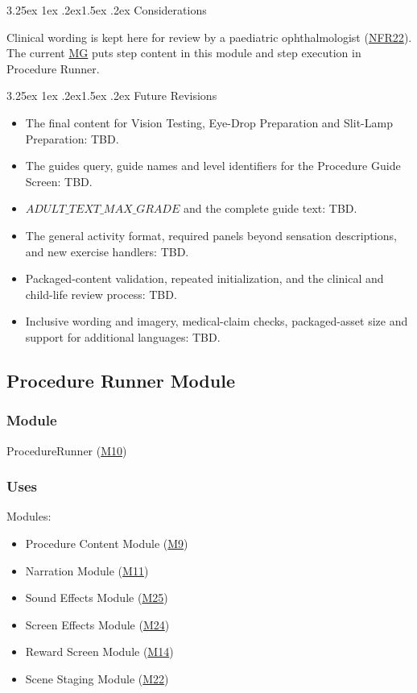 \documentclass[10pt, titlepage]{article}
\makeatletter
\newcommand{\srsurl}{https://team-hindsight.github.io/ophthamology-game/SRS/SRS.pdf}
\newcommand{\srsitemref}[2]{\href{\srsurl\#nameddest=#1}{#2}}
\newcommand{\mgurl}{https://github.com/team-hindsight/ophthamology-game/blob/main/pdfs/Design/SoftArchitecture/MG.pdf}
\newcommand{\mg}{\href{\mgurl}{MG}}
\newcommand{\misref}[2]{\hyperref[mis:#1]{M#2}}
\renewcommand\paragraph{\@startsection{paragraph}{4}{\z@}%
  {3.25ex \@plus 1ex \@minus .2ex}{1.5ex \@plus .2ex}%
  {\normalfont\normalsize\bfseries}}
\newcommand{\T}[1]{\mathit{#1}}          %
\makeatother
\begin{document}
\paragraph{Considerations}

Clinical wording is kept here for review by a paediatric ophthalmologist
(\srsitemref{NFR_ClinicalAccuracy}{NFR22}). The current \mg{} puts step
content in this module
and step execution in Procedure Runner.

\paragraph{Future Revisions}

\begin{itemize}
\item The final content for Vision Testing, Eye-Drop Preparation and
  Slit-Lamp Preparation: TBD.
\item The guides query, guide names and level identifiers for the
  Procedure Guide Screen: TBD.
\item $\T{ADULT\_TEXT\_MAX\_GRADE}$ and the complete guide text: TBD.
\item The general activity format, required panels beyond sensation
  descriptions, and new exercise handlers: TBD.
\item Packaged-content validation, repeated initialization, and the
  clinical and child-life review process: TBD.
\item Inclusive wording and imagery, medical-claim checks, packaged-asset
  size and support for additional languages: TBD.
\end{itemize}

\newpage
\subsection{Procedure Runner Module} \label{mis:Runner}

\subsubsection{Module}

ProcedureRunner (\misref{Runner}{10})

\subsubsection{Uses}

Modules:
\begin{itemize}
\item Procedure Content Module (\misref{Content}{9})
\item Narration Module (\misref{Narration}{11})
\item Sound Effects Module (\misref{Sound}{25})
\item Screen Effects Module (\misref{Effects}{24})
\item Reward Screen Module (\misref{Reward}{14})
\item Scene Staging Module (\misref{Staging}{22})
\end{itemize}
\end{document}
